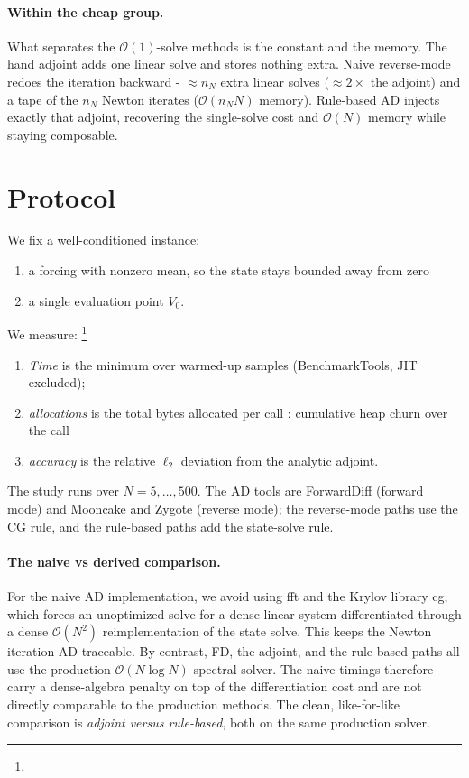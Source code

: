 \documentclass[11pt,a4paper]{article}
\begin{document}
\paragraph{Within the cheap group.}
What separates the $\mathcal O(1)$-solve methods is the constant and the memory.
The hand adjoint adds one linear solve and stores nothing extra. 
Naive reverse-mode redoes the iteration backward - $\approx n_N$ extra linear solves
($\approx 2\times$ the adjoint) and a tape of the $n_N$ Newton iterates
($\mathcal O(n_N N)$ memory). Rule-based AD injects exactly that adjoint,
recovering the single-solve cost and $\mathcal O(N)$ memory while staying
composable. 

\section{Protocol}
\label{sec:protocol}

We fix a well-conditioned instance: 
\begin{enumerate}
  \item a forcing with nonzero mean, so the state
stays bounded away from zero 
  \item a single evaluation point $V_0$.
\end{enumerate}

\noindent We measure: \footnote{}
\begin{enumerate}
\item \emph{Time} is the minimum over warmed-up samples (BenchmarkTools, JIT excluded);
\item \emph{allocations} is the total bytes allocated per call : cumulative heap churn
over the call
\item \emph{accuracy} is the relative $\ell_2$ deviation from the analytic adjoint.
\end{enumerate}
The study runs over $N=5,\dots,500$. The AD
tools are ForwardDiff (forward mode) and Mooncake and Zygote (reverse mode); the
reverse-mode paths use the CG rule, and the rule-based paths add the state-solve
rule.

\paragraph{The naive vs derived comparison.}
For the naive AD implementation, we avoid using fft and the Krylov library cg,
which forces an unoptimized solve for a dense linear system differentiated through
a dense $\mathcal O(N^2)$ reimplementation of the state solve. This keeps the
Newton iteration AD-traceable. By contrast, FD, the adjoint, and the rule-based
paths all use the production $\mathcal O(N\log N)$ spectral solver. The naive
timings therefore carry a dense-algebra penalty on top of the differentiation
cost and are not directly comparable to the production methods. The clean,
like-for-like comparison is \emph{adjoint versus rule-based}, both on the same
production solver.
\end{document}
